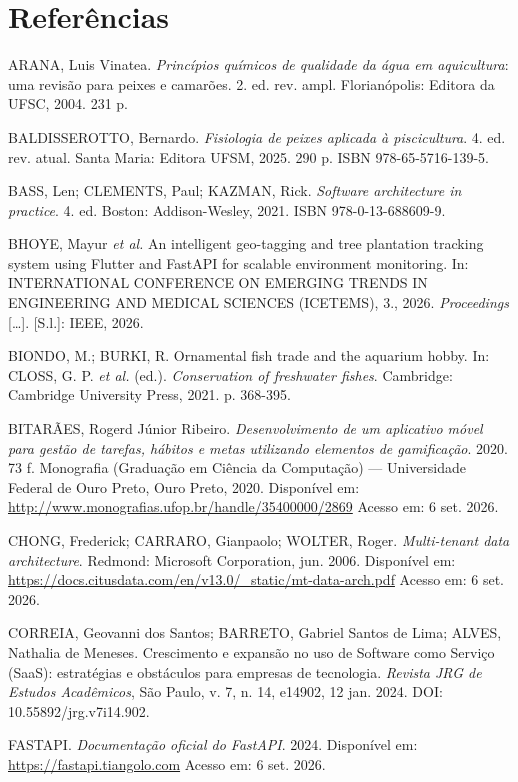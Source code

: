 \documentclass[12pt,oneside,a4paper,brazilian]{abntex2}
\begin{document}
\section*{Referências}
\begingroup\SingleSpacing\raggedright
\setlength{\parindent}{0pt}
\setlength{\parskip}{12pt}
ARANA, Luis Vinatea. \textit{Princípios químicos de qualidade da água em aquicultura}: uma revisão para peixes e camarões. 2. ed. rev. ampl. Florianópolis: Editora da UFSC, 2004. 231 p.

BALDISSEROTTO, Bernardo. \textit{Fisiologia de peixes aplicada à piscicultura}. 4. ed. rev. atual. Santa Maria: Editora UFSM, 2025. 290 p. ISBN 978-65-5716-139-5.

BASS, Len; CLEMENTS, Paul; KAZMAN, Rick. \textit{Software architecture in practice}. 4. ed. Boston: Addison-Wesley, 2021. ISBN 978-0-13-688609-9.

BHOYE, Mayur \textit{et al.} An intelligent geo-tagging and tree plantation tracking system using Flutter and FastAPI for scalable environment monitoring. In: INTERNATIONAL CONFERENCE ON EMERGING TRENDS IN ENGINEERING AND MEDICAL SCIENCES (ICETEMS), 3., 2026. \textit{Proceedings} [\ldots{}]. [S.l.]: IEEE, 2026.

BIONDO, M.; BURKI, R. Ornamental fish trade and the aquarium hobby. In: CLOSS, G. P. \textit{et al.} (ed.). \textit{Conservation of freshwater fishes}. Cambridge: Cambridge University Press, 2021. p. 368-395.

BITARÃES, Rogerd Júnior Ribeiro. \textit{Desenvolvimento de um aplicativo móvel para gestão de tarefas, hábitos e metas utilizando elementos de gamificação}. 2020. 73 f. Monografia (Graduação em Ciência da Computação) --- Universidade Federal de Ouro Preto, Ouro Preto, 2020. Disponível em: \url{http://www.monografias.ufop.br/handle/35400000/2869} Acesso em: 6 set. 2026.

CHONG, Frederick; CARRARO, Gianpaolo; WOLTER, Roger. \textit{Multi-tenant data architecture}. Redmond: Microsoft Corporation, jun. 2006. Disponível em: \url{https://docs.citusdata.com/en/v13.0/_static/mt-data-arch.pdf} Acesso em: 6 set. 2026.

CORREIA, Geovanni dos Santos; BARRETO, Gabriel Santos de Lima; ALVES, Nathalia de Meneses. Crescimento e expansão no uso de Software como Serviço (SaaS): estratégias e obstáculos para empresas de tecnologia. \textit{Revista JRG de Estudos Acadêmicos}, São Paulo, v. 7, n. 14, e14902, 12 jan. 2024. DOI: 10.55892/jrg.v7i14.902.

FASTAPI. \textit{Documentação oficial do FastAPI}. 2024. Disponível em: \url{https://fastapi.tiangolo.com} Acesso em: 6 set. 2026.
\end{document}
